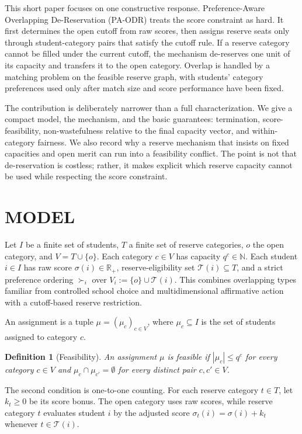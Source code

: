 \documentclass[a4paper,twoside]{article}
\newtheorem{definition}{Definition}
\renewcommand{\T}{\mathcal{T}}
\renewcommand{\R}{\mathbb{R}}
\begin{document}
This short paper focuses on one constructive response. Preference-Aware Overlapping De-Reservation (PA-ODR) treats the score constraint as hard. It first determines the open cutoff from raw scores, then assigns reserve seats only through student-category pairs that satisfy the cutoff rule. If a reserve category cannot be filled under the current cutoff, the mechanism de-reserves one unit of its capacity and transfers it to the open category. Overlap is handled by a matching problem on the feasible reserve graph, with students' category preferences used only after match size and score performance have been fixed.

The contribution is deliberately narrower than a full characterization. We give a compact model, the mechanism, and the basic guarantees: termination, score-feasibility, non-wastefulness relative to the final capacity vector, and within-category fairness. We also record why a reserve mechanism that insists on fixed capacities and open merit can run into a feasibility conflict. The point is not that de-reservation is costless; rather, it makes explicit which reserve capacity cannot be used while respecting the score constraint.

\section{\uppercase{Model}}

Let $I$ be a finite set of students, $T$ a finite set of reserve categories, $o$ the open category, and $V=T\cup\{o\}$. Each category $c\in V$ has capacity $q^c\in\mathbb{N}$. Each student $i\in I$ has raw score $\sigma(i)\in\R_+$, reserve-eligibility set $\T(i)\subseteq T$, and a strict preference ordering $\succ_i$ over $V_i:=\{o\}\cup\T(i)$. This combines overlapping types familiar from controlled school choice and multidimensional affirmative action \cite{KHIY17a,AyBo21a} with a cutoff-based reserve restriction.

An assignment is a tuple $\mu=(\mu_c)_{c\in V}$, where $\mu_c\subseteq I$ is the set of students assigned to category $c$.

\begin{definition}[Feasibility]
\label{def:paodr-feasibility}
An assignment $\mu$ is feasible if $|\mu_c|\le q^c$ for every category $c\in V$ and $\mu_c\cap\mu_{c'}=\emptyset$ for every distinct pair $c,c'\in V$.
\end{definition}

The second condition is one-to-one counting. For each reserve category $t\in T$, let $k_t\ge 0$ be its score bonus. The open category uses raw scores, while reserve category $t$ evaluates student $i$ by the adjusted score $\sigma_t(i)=\sigma(i)+k_t$ whenever $t\in\T(i)$.
\end{document}
